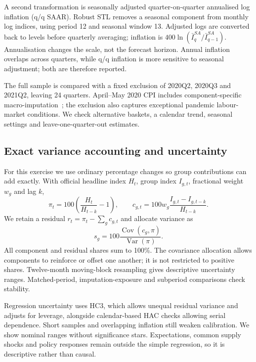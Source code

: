 \documentclass[10pt,a4paper]{article}
\begin{document}
A second transformation is seasonally adjusted quarter-on-quarter annualised log inflation (q/q SAAR). Robust STL removes a seasonal component from monthly log indices, using period 12 and seasonal window 13. Adjusted logs are converted back to levels before quarterly averaging; inflation is $400\ln(\bar I_q^{SA}/\bar I_{q-1}^{SA})$. Annualisation changes the scale, not the forecast horizon. Annual inflation overlaps across quarters, while q/q inflation is more sensitive to seasonal adjustment; both are therefore reported.

The full sample is compared with a fixed exclusion of 2020Q2, 2020Q3 and 2021Q2, leaving 24 quarters. April--May 2020 CPI includes component-specific macro-imputation~\cite{imputation}; the exclusion also captures exceptional pandemic labour-market conditions. We check alternative baskets, a calendar trend, seasonal settings and leave-one-quarter-out estimates.

\subsection{Exact variance accounting and uncertainty}

For this exercise we use ordinary percentage changes so group contributions can add exactly. With official headline index $H_t$, group index $I_{g,t}$, fractional weight $w_g$ and lag $k$,
\begin{equation}
\pi_t=100\left(\frac{H_t}{H_{t-k}}-1\right),\qquad
c_{g,t}=100w_g\frac{I_{g,t}-I_{g,t-k}}{H_{t-k}}.
\end{equation}
We retain a residual $r_t=\pi_t-\sum_g c_{g,t}$ and allocate variance as
\begin{equation}
s_g=100\frac{\operatorname{Cov}(c_g,\pi)}{\operatorname{Var}(\pi)}.
\label{eq:share}
\end{equation}
All component and residual shares sum to 100\%. The covariance allocation allows components to reinforce or offset one another; it is not restricted to positive shares. Twelve-month moving-block resampling gives descriptive uncertainty ranges. Matched-period, imputation-exposure and subperiod comparisons check stability.

Regression uncertainty uses HC3, which allows unequal residual variance and adjusts for leverage, alongside calendar-based HAC checks allowing serial dependence. Short samples and overlapping inflation still weaken calibration. We show nominal ranges without significance stars. Expectations, common supply shocks and policy responses remain outside the simple regression, so it is descriptive rather than causal.
\end{document}
